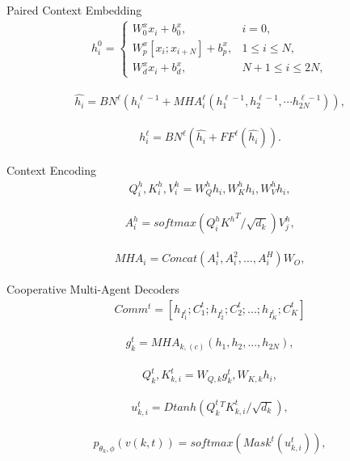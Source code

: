 \documentclass{beamer}
\begin{document}
\begin{frame}{Paired Context Embedding}
	\begin{align}
		h_i^0=\begin{cases}W_0^xx_i+b_0^x,&i=0,\\W_p^x[x_i;x_{i+N}]+b_p^x,&1\le i\le N,\\W_d^xx_i+b_d^x,&N+1\le i\le2N,\end{cases}
	\end{align}

	\begin{align}
		\hat{h_{i}}=BN^{\ell}(h_{i}^{\ell-1}+MHA_{i}^{\ell}(h_{1}^{\ell-1},h_{2}^{\ell-1},\cdots h_{2N}^{\ell-1})),
	\end{align}

	\begin{align}
		h_{i}^{\ell}=BN^{\ell}(\hat{h_{i}}+FF^{\ell}(\hat{h_{i}})).
	\end{align}
\end{frame}


\begin{frame}{Context Encoding}
	\begin{align}
		Q_i^h,K_i^h,V_i^h=W_Q^hh_i,W_K^hh_i,W_V^hh_i,
	\end{align}

	\begin{align}
		A_i^h=softmax(Q_i^h{K^h}^T/\sqrt{d_k})V_j^h,
	\end{align}

	\begin{align}
		MHA_i=Concat(A_i^1,A_i^2,...,A_i^H)W_O,
	\end{align}
\end{frame}

\begin{frame}{Cooperative Multi-Agent Decoders}
	\begin{align}
		Comm^t=[h_{I_1^t};C_1^t;h_{I_2^t};C_2^t;...;h_{I_K^t};C_K^t]
	\end{align}

	\begin{align}
		g_{k}^{t}=MHA_{k,(c)}(h_{1},h_{2},...,h_{2N}),
	\end{align}

	\begin{align}
		Q_{k}^{t},K_{k,i}^{t}=W_{Q,k}g_{k}^{t},W_{K,k}h_{i},
	\end{align}

	\begin{align}
		u_{k,i}^{t}=Dtanh(Q_{k}^{t}{}^{T}K_{k,i}^{t}/\sqrt{d_{k}}),
	\end{align}

	\begin{align}
		p_{\theta_{k},\phi}(v(k,t))=softmax(Mask^{t}(u_{k,i}^{t})),
	\end{align}

\end{frame}
\end{document}
